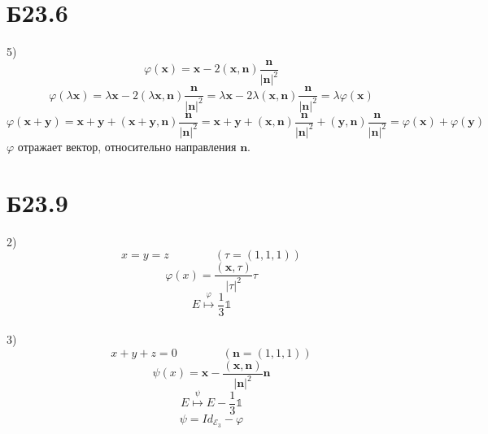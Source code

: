\section*{Б23.6}5)
$$\varphi(\textbf{x})=\textbf{x}-2(\textbf{x},\textbf{n})\frac{\textbf{n}}{|\textbf{n}|^2}$$
$$\varphi(\lambda\textbf{x})=\lambda\textbf{x}-2(\lambda\textbf{x},\textbf{n})\frac{\textbf{n}}{|\textbf{n}|^2}=\lambda\textbf{x}-2\lambda(\textbf{x},\textbf{n})\frac{\textbf{n}}{|\textbf{n}|^2}=\lambda\varphi(\textbf{x})$$
$$\varphi(\textbf{x}+\textbf{y})=\textbf{x}+\textbf{y}+(\textbf{x}+\textbf{y},\textbf{n})\frac{\textbf{n}}{|\textbf{n}|^2}=\textbf{x}+\textbf{y}+(\textbf{x},\textbf{n})\frac{\textbf{n}}{|\textbf{n}|^2}+(\textbf{y},\textbf{n})\frac{\textbf{n}}{|\textbf{n}|^2}=\varphi(\textbf{x})+\varphi(\textbf{y})$$
$\varphi$ отражает вектор, относительно направления $\textbf{n}$.
\section*{Б23.9}
2)$$x=y=z\qquad\qquad (\tau=(1,1,1))$$
$$\varphi(x)=\frac{(\textbf{x},\tau)}{|\tau|^2}\tau$$
$$E\overset{\varphi}{\mapsto}\frac{1}{3}\mathbb{1}$$
\\
3)$$x+y+z=0\qquad\qquad (\textbf{n}=(1,1,1))$$
$$\psi(x)= \textbf{x}-\frac{(\textbf{x},\textbf{n})}{|\textbf{n}|^2}\textbf{n}$$
$$E\overset{\psi}{\mapsto}E-\frac{1}{3}\mathbb{1}$$
$$\psi=Id_{\mathcal{E}_3}-\varphi$$
\\
